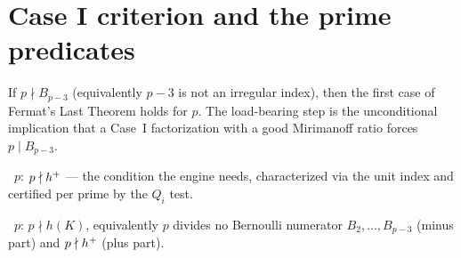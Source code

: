\section{Case I criterion and the prime predicates}\label{sec:casei}

\begin{theorem}\label{thm:caseI}
  \leanok
  If $p \nmid B_{p-3}$ (equivalently $p-3$ is not an irregular index), then the
  first case of Fermat's Last Theorem holds for $p$. The load-bearing step is the
  unconditional implication that a Case~I factorization with a good Mirimanoff
  ratio forces $p \mid B_{p-3}$.
\end{theorem}

\begin{definition}\label{def:vandiverprime}
  \leanok
  ~$p$: $p \nmid h^{+}$ --- the condition the engine needs,
  characterized via the unit index and certified per prime by the $Q_i$ test.
\end{definition}

\begin{definition}\label{def:regularprime}
  \leanok
  ~$p$: $p \nmid h(K)$, equivalently $p$ divides no Bernoulli
  numerator $B_2,\dots,B_{p-3}$ (minus part) and $p \nmid h^{+}$ (plus part).
\end{definition}
